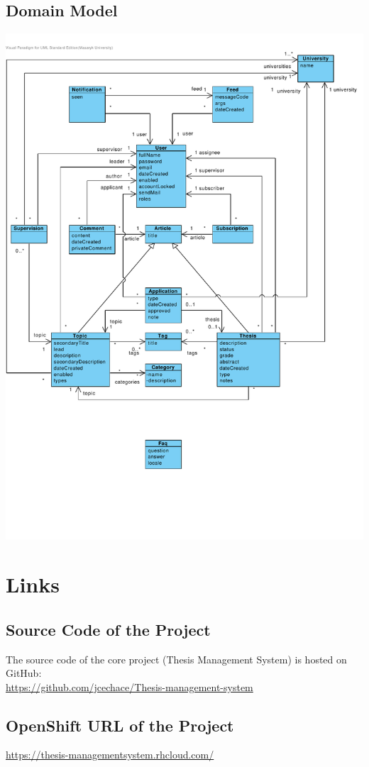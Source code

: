 \documentclass[11pt,oneside]{fithesis2}
\begin{document}
\section{Domain Model}
\includegraphics[keepaspectratio, trim=0 100 10 30, clip, width=\textwidth]{./images/domain-model.pdf}

\chapter{Links}

\section{Source Code of the Project}
The source code of the core project (Thesis Management System) is hosted on GitHub:\\
\url{https://github.com/jcechace/Thesis-management-system}

\section{OpenShift URL of the Project}
\url{https://thesis-managementsystem.rhcloud.com/}
\end{document}
